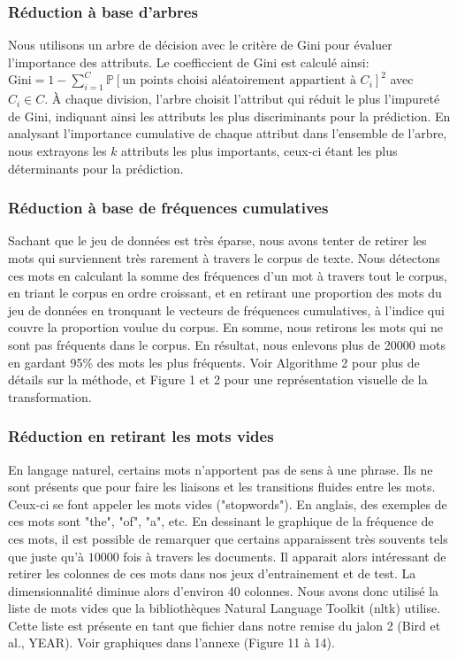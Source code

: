 \documentclass{article}
\begin{document}
\subsubsection{Réduction à base d'arbres}
Nous utilisons un arbre de décision avec le critère de Gini pour évaluer l'importance des attributs. Le coefficcient de Gini est calculé ainsi: $\text{Gini} = 1 - \sum_{i=1}^{C} \mathbb{P}[\text{un points choisi aléatoirement appartient à $C_i$}]^2$ avec $C_i \in C$. À chaque division, l’arbre choisit l’attribut qui réduit le plus l'impureté de Gini, indiquant ainsi les attributs les plus discriminants pour la prédiction. En analysant l'importance cumulative de chaque attribut dans l'ensemble de l'arbre, nous extrayons les $k$ attributs les plus importants, ceux-ci étant les plus déterminants pour la prédiction.
\subsubsection{Réduction à base de fréquences cumulatives}
Sachant que le jeu de données est très éparse,  nous avons tenter de retirer les mots qui surviennent très rarement à travers le corpus de texte. Nous détectons ces mots en calculant la somme des fréquences d'un mot à travers tout le corpus, en triant le corpus en ordre croissant, et en retirant une proportion des mots du jeu de données en tronquant le vecteurs de fréquences cumulatives, à l'indice qui couvre la proportion voulue du corpus. En somme, nous retirons les mots qui ne sont pas fréquents dans le corpus. En résultat, nous enlevons plus de 20000 mots en gardant 95\% des mots les plus fréquents. Voir Algorithme 2 pour plus de détails sur la méthode, et Figure 1 et 2 pour une représentation visuelle de la transformation. 
\subsubsection{Réduction en retirant les mots vides}
En langage naturel, certains mots n'apportent pas de sens à une phrase. Ils ne sont présents que pour faire les liaisons et les transitions fluides entre les mots. Ceux-ci se font appeler les mots vides ("stopwords"). En anglais, des exemples de ces mots sont "the", "of", "a", etc. En dessinant le graphique de la fréquence de ces mots, il est possible de remarquer que certains apparaissent très souvents tels que juste qu'à $10 000$ fois à travers les documents. Il apparait alors intéressant de retirer les colonnes de ces mots dans nos jeux d'entrainement et de test. La dimensionnalité diminue alors d'environ 40 colonnes. Nous avons donc utilisé la liste de mots vides que la bibliothèques Natural Language Toolkit (nltk) utilise. Cette liste est présente en tant que fichier dans notre remise du jalon 2 (Bird et al., YEAR). Voir graphiques dans l'annexe (Figure 11 à 14).
\end{document}
